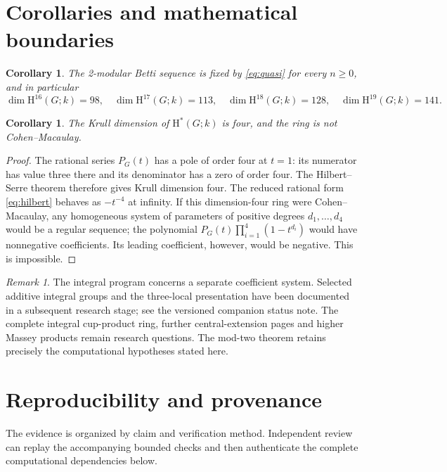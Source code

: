 \documentclass[11pt,a4paper]{article}
\newtheorem{corollary}[theorem]{Corollary}
\theoremstyle{remark}\newtheorem{remark}[theorem]{Remark}
\newcommand{\HH}{\mathrm H}
\begin{document}
\section{Corollaries and mathematical boundaries}
\begin{corollary}
The 2-modular Betti sequence is fixed by \eqref{eq:quasi} for every \(n\ge0\), and in particular
\[
\dim\HH^{16}(G;k)=98,\quad
\dim\HH^{17}(G;k)=113,\quad
\dim\HH^{18}(G;k)=128,\quad
\dim\HH^{19}(G;k)=141.
\]
\end{corollary}
\begin{corollary}\label{cor:noncm}
The Krull dimension of \(\HH^*(G;k)\) is four, and the ring is not Cohen--Macaulay.
\end{corollary}
\begin{proof}
The rational series \(P_G(t)\) has a pole of order four at \(t=1\): its numerator has value three there and its denominator has a zero of order four. The Hilbert--Serre theorem therefore gives Krull dimension four. The reduced rational form \eqref{eq:hilbert} behaves as \(-t^{-4}\) at infinity. If this dimension-four ring were Cohen--Macaulay, any homogeneous system of parameters of positive degrees \(d_1,\dots,d_4\) would be a regular sequence; the polynomial \(P_G(t)\prod_{i=1}^4(1-t^{d_i})\) would have nonnegative coefficients. Its leading coefficient, however, would be negative. This is impossible.
\end{proof}

\begin{remark}
The integral program concerns a separate coefficient system. Selected additive integral groups and the three-local presentation have been documented in a subsequent research stage; see the versioned companion status note. The complete integral cup-product ring, further central-extension pages and higher Massey products remain research questions. The mod-two theorem retains precisely the computational hypotheses stated here.
\end{remark}

\section{Reproducibility and provenance}\label{sec:certificates}
The evidence is organized by claim and verification method. Independent review can replay the accompanying bounded checks and then authenticate the complete computational dependencies below.
\end{document}
